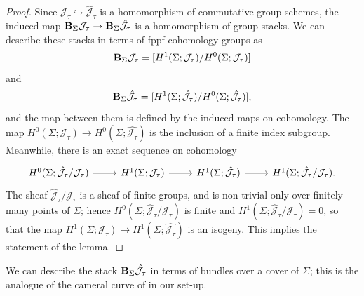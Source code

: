 \documentclass{amsart}
\theoremstyle{remark}
\numberwithin{theorem}{section}
\numberwithin{equation}{section}
\begin{document}
\begin{proof}
Since $\mathcal J_\tau \hookrightarrow \hat{\mathcal J}_\tau$ is a homomorphism of commutative group schemes, the induced map ${\bf B}_\Sigma \mathcal J_\tau \rightarrow {\bf B}_\Sigma \hat{\mathcal J}_\tau$ is a homomorphism of group stacks. We can describe these stacks in terms of fppf cohomology groups as
\begin{equation}\label{PicardStackIsogeny1eqn}
    {\bf B}_\Sigma \mathcal J_\tau = [H^1(\Sigma;\mathcal J_\tau)/H^0(\Sigma;\mathcal J_\tau)]
\end{equation}
and
\begin{equation}\label{PicardStackIsogeny2eqn}
    {\bf B}_\Sigma \hat{\mathcal J_\tau} = [H^1(\Sigma;\hat{\mathcal J}_\tau)/H^0(\Sigma;\hat{\mathcal J}_\tau)],
\end{equation}
and the map between them is defined by the induced maps on cohomology. The map $H^0(\Sigma;\mathcal J_\tau) \rightarrow H^0(\Sigma;\hat{\mathcal J_\tau})$ is the inclusion of a finite index subgroup. Meanwhile, there is an exact sequence on cohomology
\begin{equation}\label{PicardStackIsogeny3eqn}
\begin{tikzcd}
H^0(\Sigma;\hat{\mathcal J}_\tau/\mathcal J_\tau)  \arrow[r] & H^1(\Sigma;\mathcal J_\tau)  \arrow[r] & H^1(\Sigma;\hat{\mathcal J}_\tau)  \arrow[r] & H^1(\Sigma;\hat{\mathcal J}_\tau/\mathcal J_\tau). 
\end{tikzcd}
\end{equation}
The sheaf $\hat{\mathcal J}_\tau/\mathcal J_\tau$ is a sheaf of finite groups, and is non-trivial only over finitely many points of $\Sigma$; hence $H^0(\Sigma;\hat{\mathcal J}_\tau/\mathcal J_\tau)$ is finite and $H^1(\Sigma;\hat{\mathcal J}_\tau/\mathcal J_\tau)=0$, so that the map $H^1(\Sigma;\mathcal J_\tau) \rightarrow H^1(\Sigma;\hat{\mathcal J_\tau})$ is an isogeny. This implies the statement of the lemma.
\end{proof}

We can describe the stack ${\bf B}_\Sigma\hat{\mathcal J}_\tau$ in terms of bundles over a cover of $\Sigma$; this is the analogue of the cameral curve of \cite{Donagi} in our set-up.
\end{document}
